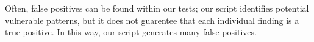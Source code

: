 Often, false positives can be found within our tests; our script 
identifies potential vulnerable patterns, but it does not guarentee
that each individual finding is a true positive. In this way, our script
generates many false positives.



